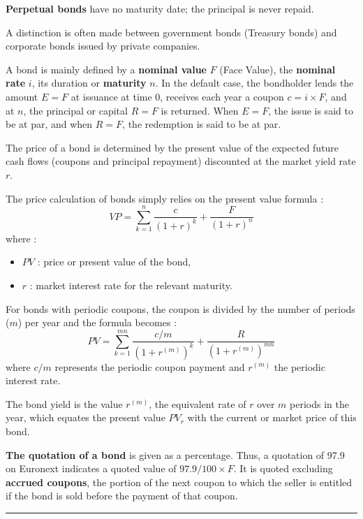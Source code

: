 \begin{f}
\textbf{Perpetual bonds} have no maturity date; the principal is never repaid.
 
A distinction is often made between government bonds (Treasury bonds) and
 corporate bonds issued by private companies.



A bond is mainly defined by a \textbf{nominal value} \(F\) (Face Value), the \textbf{nominal rate} \(i\), its duration or \textbf{maturity} \(n\).
In the default case, the bondholder lends the amount \(E=F\) at issuance at time 0, receives each year a coupon \(c = i \times F\), and at \(n\), the principal or capital \(R=F\) is returned.
When \(E=F\), the issue is said to be at par, and when \(R=F\), the redemption is said to be at par.


The price of a bond is determined by the present value of the expected future cash flows (coupons and principal repayment) discounted at the market yield rate \(r\).
 
The price calculation of bonds simply relies on the present value formula :
\[
VP = \sum_{k=1}^{n} \frac{c}{(1 + r)^k} + \frac{F}{(1 + r)^n}
 \]
where :
\begin{itemize}
	\item \(PV\) : price or present value of the bond,
	\item \(r\) : market interest rate for the relevant maturity.
\end{itemize}


For bonds with periodic coupons, the coupon is divided by the number of periods (\(m\)) per year and the formula becomes :
\[ 
PV = \sum_{k=1}^{mn} \frac{c/m}{(1 + r^{(m)})^k} + \frac{R}{(1 + r^{(m)})^{mn}}
 \]
where \(c/m\) represents the periodic coupon payment and \(r^{(m)}\) the periodic interest rate.

The bond yield is the value \(r^{(m)}\), the equivalent rate of \(r\) over \(m\) periods in the year, which equates the present value \(PV_r\) with the current or market price of this bond.

\textbf{The quotation of a bond} is given as a percentage. Thus, a quotation of 97.9 on Euronext indicates a quoted value of \(97.9 / 100 \times F\). 
It is quoted excluding \textbf{accrued coupons}, the portion of the next coupon to which the seller is entitled if the bond is sold before the payment of that coupon.
\end{f}
\hrule

